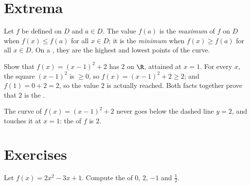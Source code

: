 \section{Extrema}

\begin{definition}\label{def:g10:functions:extrema}
Let $f$ be defined on $D$ and $a \in D$. The value $f(a)$ is the
\emph{maximum} of $f$ on $D$ when $f(x) \leq f(a)$ for all
$x \in D$; it is the \emph{minimum} when
$f(x) \geq f(a)$ for all $x \in D$. On a , they are the highest and
lowest points of the curve.
\end{definition}

\begin{example}\label{ex:g10:functions:extremum}
Show that $f(x) = (x - 1)^2 + 2$ has  $2$ on $\R$, attained at
$x = 1$. For every $x$, the square $(x-1)^2$ is $\geq 0$, so
$f(x) = (x-1)^2 + 2 \geq 2$; and $f(1) = 0 + 2 = 2$, so the value $2$ is
actually reached. Both facts together prove that $2$ is the .
\end{example}

\begin{omfigure}

{\small The curve of $f(x) = (x-1)^2 + 2$ never goes below the dashed line
$y = 2$, and touches it at $x = 1$: the  of $f$ is $2$.}
\end{omfigure}

\section{Exercises}

\begin{exercise}[$\star$]\label{exo:g10:functions:1}
Let $f(x) = 2x^2 - 3x + 1$. Compute the  of $0$, $2$, $-1$ and
$\frac12$.
\end{exercise}

